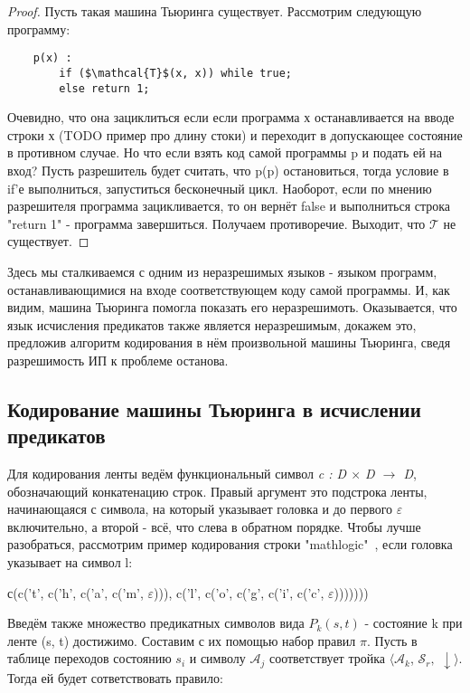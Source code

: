 \documentclass{article}
\begin{document}
\begin{proof} 
Пусть такая машина Тьюринга существует. Рассмотрим следующую программу:

\begin{verbatim}
    p(x) : 
        if ($\mathcal{T}$(x, x)) while true;
        else return 1;
\end{verbatim}

Очевидно, что она зациклиться если если программа х останавливается на вводе строки х (TODO пример про длину стоки) и переходит в допускающее состояние в противном случае. Но что если взять код самой программы p и подать ей на вход? Пусть разрешитель будет считать, что p(p) остановиться, тогда условие в if'е выполниться, запуститься бесконечный цикл. Наоборот, если по мнению разрешителя программа зацикливается, то он вернёт false и выполниться строка "return 1" - программа завершиться. Получаем противоречие. Выходит, что $\mathcal{T}$ не существует.
\end{proof}

Здесь мы сталкиваемся с одним из неразрешимых языков - языком программ, останавливающимися на входе соответствующем коду самой программы. И, как видим, машина Тьюринга помогла показать его неразрешимоть. Оказывается, что язык исчисления предикатов также является неразрешимым, докажем это, предложив алгоритм кодирования в нём произвольной машины Тьюринга, сведя разрешимость ИП к проблеме останова.

\subsection{Кодирование машины Тьюринга в исчислении предикатов}

Для кодирования ленты ведём функциональный символ \textit{c : D $\times$ D $\rightarrow$ D}, обозначающий конкатенацию строк. Правый аргумент это подстрока ленты, начинающаяся с символа, на который указывает головка и до первого $\varepsilon$ включительно, а второй - всё, что слева в обратном порядке. Чтобы лучше разобраться, рассмотрим пример кодирования строки "mathlogic"\ , если головка указывает на символ l:

\begin{center}
        с(c('t', c('h', c('a', c('m', $\varepsilon$))), c('l', c('o', c('g', c('i', c('c', $\varepsilon$)))))))
\end{center}

Введём также множество предикатных символов вида $P_k(s, t)$ - состояние k при ленте (s, t) достижимо.
Составим с их помощью набор правил $\pi$. Пусть в таблице переходов состоянию $s_i$ и символу $\mathcal{A}_j$ соответствует тройка $\langle\mathcal{A}_k$,  $\mathcal{S}_r,$ $\downarrow\rangle$. Тогда ей будет сответствовать правило:
\end{document}
